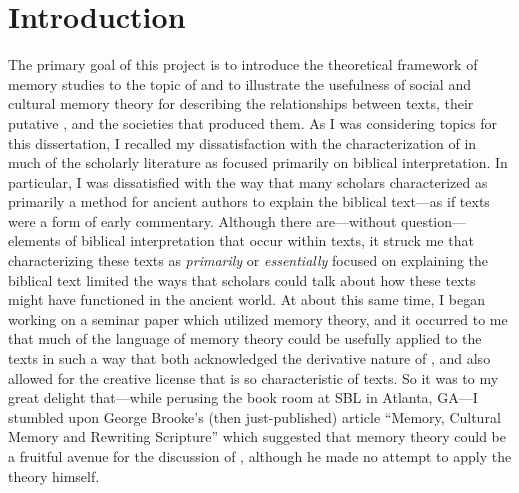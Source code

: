 
\chapter*{Introduction}


The primary goal of this project is to introduce the theoretical framework of memory studies to the topic of \rwb and to illustrate the usefulness of social and cultural memory theory for describing the relationships between \rwb texts, their putative \vorlagen, and the societies that produced them. As I was considering topics for this dissertation, I recalled my dissatisfaction with the characterization of \rwb in much of the scholarly literature as focused primarily on biblical interpretation. In particular, I was dissatisfied with the way that many scholars characterized \rwb as primarily a method for ancient authors to explain the biblical text---as if \rwb texts were a form of early commentary. Although there are---without question---elements of biblical interpretation that occur within \rwb texts, it struck me that characterizing these texts as \emph{primarily} or \emph{essentially} focused on explaining the biblical text limited the ways that scholars could talk about how these texts might have functioned in the ancient world. At about this same time, I began working on a seminar paper which utilized memory theory, and it occurred to me that much of the language of memory theory could be usefully applied to the \rwb texts in such a way that both acknowledged the derivative nature of \rwb, and also allowed for the creative license that is so characteristic of \rwb texts. So it was to my great delight that---while perusing the book room at SBL in Atlanta, GA---I stumbled upon George Brooke's (then just-published) article ``Memory, Cultural Memory and Rewriting Scripture'' which suggested that memory theory could be a fruitful avenue for the discussion of \rwb, although he made no attempt to apply the theory himself.%
    \autocite{brooke_zsengeller2014}





